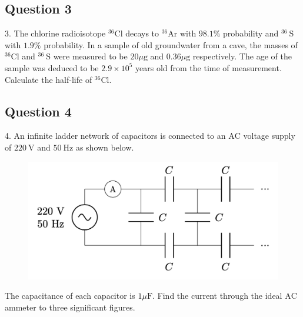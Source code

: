 \documentclass{article}
\begin{document}
\subsection{Question 3}
3. The chlorine radioisotope ${ }^{36} \mathrm{Cl}$ decays to ${ }^{36} \mathrm{Ar}$ with $98.1 \%$ probability and ${ }^{36} \mathrm{~S}$ with $1.9 \%$ probability. In a sample of old groundwater from a cave, the masses of ${ }^{36} \mathrm{Cl}$ and ${ }^{36} \mathrm{~S}$ were measured to be $20 \mu \mathrm{g}$ and $0.36 \mu \mathrm{g}$ respectively. The age of the sample was deduced to be $2.9 \times 10^{5}$ years old from the time of measurement. Calculate the half-life of ${ }^{36} \mathrm{Cl}$.

\subsection{Question 4}
4. An infinite ladder network of capacitors is connected to an $\mathrm{AC}$ voltage supply of $220 \mathrm{~V}$ and $50 \mathrm{~Hz}$ as shown below.
\begin{figure}
	\centering
	\includegraphics[width=0.5\linewidth]{spho_book_TYS_images/2017q4.png}
	\caption{}
\end{figure}
The capacitance of each capacitor is $1 \mu \mathrm{F}$. Find the current through the ideal $\mathrm{AC}$ ammeter to three significant figures.
\end{document}
